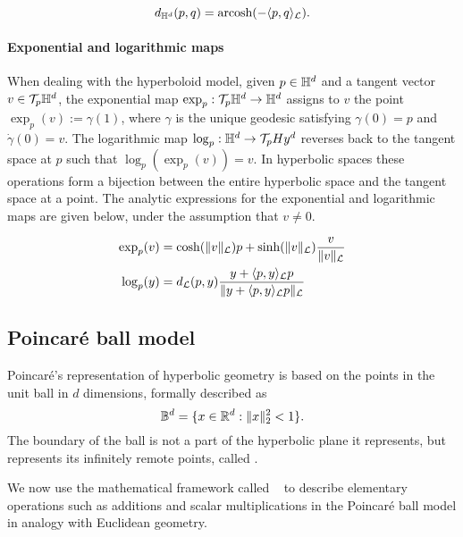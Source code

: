 \begin{equation}\label{eq:distance_hyperboloid}
    d_{\mathbb{H}^d}(p, q) = \text{arcosh}(-\langle p, q \rangle_{\mathcal{L}}).
\end{equation}

\paragraph{Exponential and logarithmic maps}
When dealing with the hyperboloid model, given $p \in \mathbb{H}^d$ and a tangent vector $v \in \mathcal{T}_p\mathbb{H}^d$, the exponential map $\exp_p: \mathcal{T}_p\mathbb{H}^d \to \mathbb{H}^d$ assigns to $v$ the point $\exp_p(v) := \gamma(1)$, where $\gamma$ is the unique geodesic satisfying $\gamma(0) = p$ and $\dot{\gamma}(0) = v$. The logarithmic map $\log_p: \mathbb{H}^d \to \mathcal{T}_pHy^d$ reverses back to the tangent space at $p$ such that $\log_p(\exp_p(v)) = v$. In hyperbolic spaces these operations form a bijection between the entire hyperbolic space and the tangent space at a point. The analytic expressions for the exponential and logarithmic maps are given below, under the assumption that $v\neq 0$.

\begin{align}
    \exp_p(v) &= \cosh(\|v\|_{\mathcal{L}})p + \sinh(\|v\|_{\mathcal{L}}) \frac{v}{\|v\|_{\mathcal{L}}} \label{eq:log_hyperboloid}\\
    \log_p(y) &= d_{\mathcal{L}}(p,y)\frac{y + \langle p,y \rangle_{\mathcal{L}}p}{\|y + \langle p,y \rangle_{\mathcal{L}}p\|_{\mathcal{L}}} \label{eq:exp_hyperboloid}
\end{align}

\subsection{Poincaré ball model}\label{sec:poincareBall}
Poincaré's representation of hyperbolic geometry is based on the points in the unit ball in $d$ dimensions, formally described as
\begin{equation*}
    \mathbb{B}^d = \{x \in \mathbb{R}^d: \|x\|^2_2 < 1\}.
\end{equation*}
The boundary of the ball is not a part of the hyperbolic plane it represents, but represents its infinitely remote points, called .

We now use the mathematical framework called ~\cite{ungar2022gyrovectorSpaceHyperbolicGeometry}\cite{Ungar1999HyperbolicPythagoreanTheoremPoincareDiscModel} to describe elementary operations such as additions and scalar multiplications in the Poincaré ball model in analogy with Euclidean geometry.

